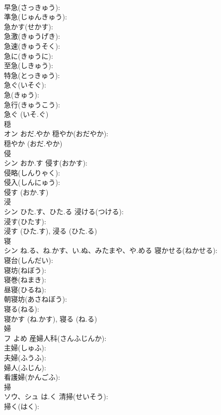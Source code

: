 \documentclass[8pt]{extreport}
\begin{document}
\begin{CJK}{UTF8}{min}
\\	早急(さっきゅう): 
\\	準急(じゅんきゅう): 
\\	急かす(せかす): 
\\	急激(きゅうげき): 
\\	急速(きゅうそく): 
\\	急に(きゅうに): 
\\	至急(しきゅう): 
\\	特急(とっきゅう): 
\\	急ぐ(いそぐ): 
\\	急(きゅう): 
\\	急行(きゅうこう): 
\\	急ぐ (いそ.ぐ)
\\	穏			
\\	オン	おだ.やか	穏やか(おだやか): 
\\	穏やか (おだ.やか)
\\	侵			
\\	シン	おか.す	侵す(おかす): 
\\	侵略(しんりゃく): 
\\	侵入(しんにゅう): 
\\	侵す (おか.す)
\\	浸			
\\	シン	ひた.す、ひた.る	浸ける(つける): 
\\	浸す(ひたす): 
\\	浸す (ひた.す), 浸る (ひた.る)
\\	寝			
\\	シン	ね.る、ね.かす、い.ぬ、みたまや、や.める	寝かせる(ねかせる): 
\\	寝台(しんだい): 
\\	寝坊(ねぼう): 
\\	寝巻(ねまき): 
\\	昼寝(ひるね): 
\\	朝寝坊(あさねぼう): 
\\	寝る(ねる): 
\\	寝かす (ね.かす), 寝る (ね.る)
\\	婦			
\\	フ	よめ	産婦人科(さんふじんか): 
\\	主婦(しゅふ): 
\\	夫婦(ふうふ): 
\\	婦人(ふじん): 
\\	看護婦(かんごふ): 
\\	掃			
\\	ソウ、シュ	は.く	清掃(せいそう): 
\\	掃く(はく): 

\end{CJK}
\end{document}
